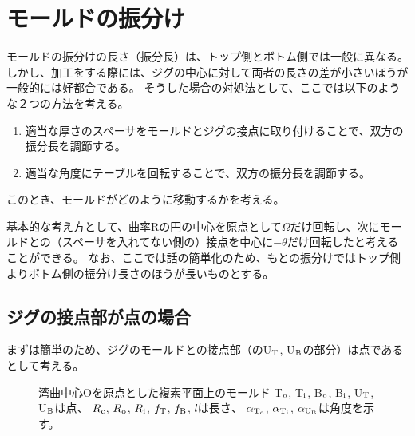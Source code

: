 \chapter{モールドの振分け}
モールドの振分けの長さ（振分長）は、トップ側とボトム側では一般に異なる。
しかし、加工をする際には、ジグの中心に対して両者の長さの差が小さいほうが一般的には好都合である。
そうした場合の対処法として、ここでは以下のような２つの方法を考える。
\begin{enumerate}
\item
適当な厚さのスペーサをモールドとジグの接点に取り付けることで、双方の振分長を調節する。
\item
適当な角度にテーブルを回転することで、双方の振分長を調節する。
\end{enumerate}
このとき、モールドがどのように移動するかを考える。

基本的な考え方として、曲率Rの円の中心を原点として$\Omega$だけ回転し、次にモールドとの（スペーサを入れてない側の）接点を中心に$-\theta$だけ回転したと考えることができる。
なお、ここでは話の簡単化のため、もとの振分けではトップ側よりボトム側の振分け長さのほうが長いものとする。




\section{ジグの接点部が点の場合}
まずは簡単のため、ジグのモールドとの接点部（のU$_\text T$, U$_\text B$の部分）は点であるとして考える。
\begin{figure}[t]
\centering
\begin{Figbox}
\mouldCoordinate
\caption[湾曲中心Oを原点とした複素平面上のモールド]
  {湾曲中心Oを原点とした複素平面上のモールド\newline
   T$_\text o$, T$_\text i$, B$_\text o$, B$_\text i$, U$_\text T$, U$_\text B$は点、
   $R_\text c$, $R_\text o$, $R_\text i$, $f_\text T$, $f_\text B$, $l$は長さ、
   $\alpha_{\text T_\text o}$, $\alpha_{\text T_\text i}$, $\alpha_{\text U_\text B}$は角度を示す。}
\label{fig:mouldOnComplexPlane1}
\end{Figbox}
\end{figure}



